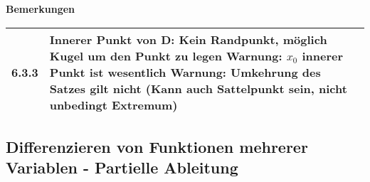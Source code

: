     \noindent
    \textbf{Bemerkungen}
    \begin{table}[H]
    \begin{tabularx}{\textwidth}{X m{16cm}}
        \toprule

        6.3.3 & Innerer Punkt von D: Kein Randpunkt, möglich Kugel um den Punkt zu legen \hfill \break
                Warnung: $x_0$ innerer Punkt ist wesentlich \hfill \break
                Warnung: Umkehrung des Satzes gilt nicht (Kann auch Sattelpunkt sein, nicht unbedingt Extremum) \\

        \bottomrule
    \end{tabularx}
    \end{table}

    \pagebreak

\subsection{Differenzieren von Funktionen mehrerer Variablen - Partielle Ableitung}


